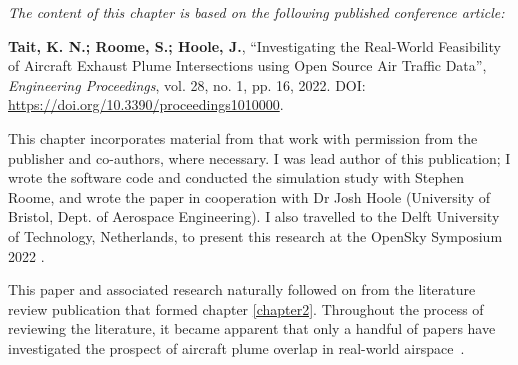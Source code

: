 \textit{The content of this chapter is based on the following published conference article:}

\textbf{Tait, K. N.; Roome, S.; Hoole, J.}, ``Investigating the Real-World Feasibility of Aircraft Exhaust Plume Intersections using Open Source Air Traffic Data'', \textit{Engineering Proceedings}, vol. 28, no. 1, pp. 16, 2022. DOI: \url{https://doi.org/10.3390/proceedings1010000}.

This chapter incorporates material from that work with permission from the publisher and co-authors, where necessary. I was lead author of this publication; I wrote the software code and conducted the simulation study with Stephen Roome, and wrote the paper in cooperation with Dr Josh Hoole (University of Bristol, Dept. of Aerospace Engineering). I also travelled to the Delft University of Technology, Netherlands, to present this research at the OpenSky Symposium 2022 \cite{Opensky2022}.

This paper and associated research naturally followed on from the literature review publication that formed chapter \ref{chapter2}. Throughout the process of reviewing the literature, it became apparent that only a handful of papers have investigated the prospect of aircraft plume overlap in real-world airspace~\cite{x}.









